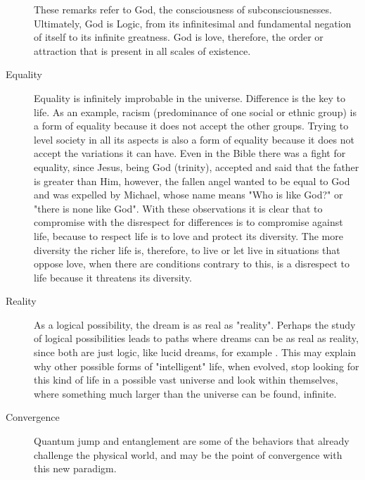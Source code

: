 \begin{description}
\begin{description}
	   \end{description}
	These remarks refer to God, the consciousness of subconsciousnesses. Ultimately, God is Logic, from its infinitesimal and fundamental negation of itself to its infinite greatness. God is love, therefore, the order or attraction that is present in all scales of existence.
	   \item[Equality] Equality is infinitely improbable in the universe. Difference is the key to life. As an example, racism (predominance of one social or ethnic group) is a form of equality because it does not accept the other groups. Trying to level society in all its aspects is also a form of equality because it does not accept the variations it can have. Even in the Bible there was a fight for equality, since Jesus, being God (trinity), accepted and said that the father is greater than Him, however, the fallen angel wanted to be equal to God and was expelled by Michael, whose name means "Who is like God?" or "there is none like God". With these observations it is clear that to compromise with the disrespect for differences is to compromise against life, because to respect life is to love and protect its diversity. The more diversity the richer life is, therefore, to live or let live in situations that oppose love, when there are conditions contrary to this, is a disrespect to life because it threatens its diversity.
	   \item[Reality] As a logical possibility, the dream is as real as "reality". Perhaps the study of logical possibilities leads to paths where dreams can be as real as reality, since both are just logic, like lucid dreams, for example \cite{lucid_dreams}.  This may explain why other possible forms of "intelligent" life, when evolved, stop looking for this kind of life in a possible vast universe and look within themselves, where something much larger than the universe can be found, infinite.
	   \item[Convergence] Quantum jump and entanglement are some of the behaviors that already challenge the physical world, and may be the point of convergence with this new paradigm.
	\end{description}